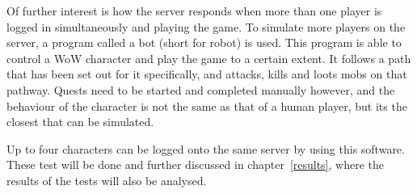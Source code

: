 Of further interest is how the server responds when more than one player is logged in simultaneously and playing the game. To simulate more players on the server, a program called a bot (short for robot) is used. This program is able to control a WoW character and play the game to a certain extent. It follows a path that has been set out for it specifically, and attacks, kills and loots mobs on that pathway. Quests need to be started and completed manually however, and the behaviour of the character is not the same as that of a human player, but its the closest that can be simulated.

Up to four characters can be logged onto the same server by using this software. These test will be done and further discussed in chapter~\ref{results}, where the results of the tests will also be analysed.

%
%

